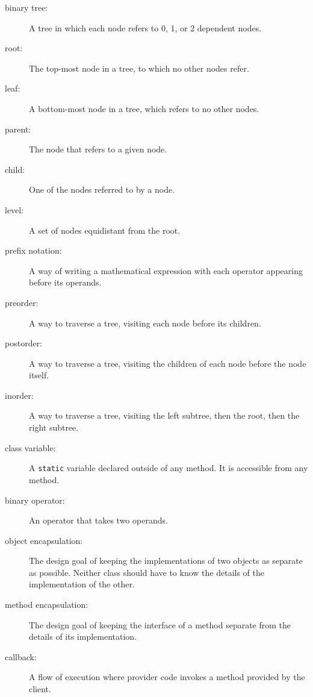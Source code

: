 \begin{description}

\item[binary tree:]  A tree in which each node refers to 0, 1, or
2 dependent nodes.

\item[root:]  The top-most node in a tree, to which no other nodes
refer.

\item[leaf:]  A bottom-most node in a tree, which refers to no other
nodes.

\item[parent:]  The node that refers to a given node.

\item[child:]  One of the nodes referred to by a node.

\item[level:]  A set of nodes equidistant from the root.

\item[prefix notation:]  A way of writing a mathematical expression
with each operator appearing before its operands.

\item[preorder:]  A way to traverse a tree, visiting each node
before its children.

\item[postorder:]  A way to traverse a tree, visiting the children
of each node before the node itself.

\item[inorder:]  A way to traverse a tree, visiting the left subtree,
then the root, then the right subtree.

\item[class variable:]  A {\tt static} variable declared outside of any
method.  It is accessible from any method.

\item[binary operator:]  An operator that takes two operands.

\item[object encapsulation:]  The design goal of keeping
the implementations of two objects as separate as possible.  Neither
class should have to know the details of the implementation of
the other.

\item[method encapsulation:]  The design goal of keeping the
interface of a method separate from the details of its implementation.

\item[callback:] A flow of execution where provider code invokes
a method provided by the client.

\end{description}



